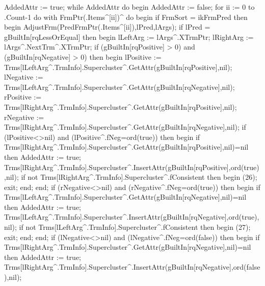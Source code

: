    AddedAttr := true;
   while AddedAttr do
   begin
      AddedAttr := false;
      for ii := 0 to .Count-1 do
         with FrmPtr(.Items^[ii])^ do
      begin
         if FrmSort = ikFrmPred then
         begin
            AdjustFrm(PredFrmPtr(.Items^[ii]),lPred,lArgs);
            if lPred = gBuiltIn[rqLessOrEqual] then
            begin
               lLeftArg := lArgs^.XTrmPtr;
               lRightArg := lArgs^.NextTrm^.XTrmPtr;
               if (gBuiltIn[rqPositive] > 0) and (gBuiltIn[rqNegative] > 0) then
               begin
                  lPositive := Trms[lLeftArg^.TrmInfo].Supercluster^.GetAttr(gBuiltIn[rqPositive],nil);
                  lNegative := Trms[lLeftArg^.TrmInfo].Supercluster^.GetAttr(gBuiltIn[rqNegative],nil);
                  rPositive := Trms[lRightArg^.TrmInfo].Supercluster^.GetAttr(gBuiltIn[rqPositive],nil);
                  rNegative := Trms[lRightArg^.TrmInfo].Supercluster^.GetAttr(gBuiltIn[rqNegative],nil);
                  if (lPositive<>nil) and (lPositive^.fNeg=ord(true)) then
                  begin
                     if Trms[lRightArg^.TrmInfo].Supercluster^.GetAttr(gBuiltIn[rqPositive],nil)=nil
                     then AddedAttr := true;
                     Trms[lRightArg^.TrmInfo].Supercluster^.InsertAttr(gBuiltIn[rqPositive],ord(true),nil);
                     if not Trms[lRightArg^.TrmInfo].Supercluster^.fConsistent then
                     begin
                        (26);
                        exit;
                     end;
                  end;
                  if (rNegative<>nil) and (rNegative^.fNeg=ord(true)) then
                  begin
                     if Trms[lLeftArg^.TrmInfo].Supercluster^.GetAttr(gBuiltIn[rqNegative],nil)=nil then AddedAttr := true;
                     Trms[lLeftArg^.TrmInfo].Supercluster^.InsertAttr(gBuiltIn[rqNegative],ord(true),nil);
                     if not Trms[lLeftArg^.TrmInfo].Supercluster^.fConsistent then
                     begin
                        (27);
                        exit;
                     end;
                  end;
                  if (lNegative<>nil) and (lNegative^.fNeg=ord(false)) then
                  begin
                     if Trms[lRightArg^.TrmInfo].Supercluster^.GetAttr(gBuiltIn[rqNegative],nil)=nil then AddedAttr := true;
                     Trms[lRightArg^.TrmInfo].Supercluster^.InsertAttr(gBuiltIn[rqNegative],ord(false),nil);
